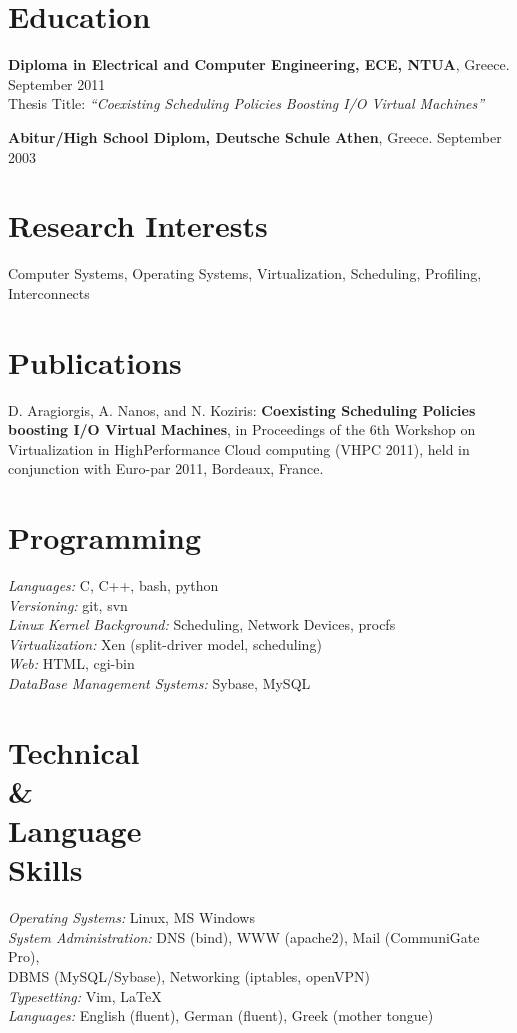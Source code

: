 \documentclass[margin,centered]{res}
\newenvironment{list1}{
  \begin{list}{\ding{71}}{%
      \setlength{\itemsep}{0in}
      \setlength{\parsep}{0in} \setlength{\parskip}{0in}
      \setlength{\topsep}{0in} \setlength{\partopsep}{0in}
      \setlength{\leftmargin}{0.17in}}}{\end{list}}
\begin{document}
\begin{resume}

\section{\sc Education}
\begin{list1}
\item
{\bf Diploma in Electrical and Computer Engineering, ECE, NTUA}, Greece. September 2011\\
Thesis Title:  \textit{``Coexisting Scheduling Policies Boosting I/O Virtual Machines''}
\item
{\bf Abitur/High School Diplom, Deutsche Schule Athen}, Greece. September 2003
\end{list1}
\section{\sc Research Interests}
Computer Systems, Operating Systems, Virtualization, Scheduling, Profiling, Interconnects

\section{\sc Publications}
D. Aragiorgis, A. Nanos, and N. Koziris: \textbf{Coexisting Scheduling Policies boosting I/O Virtual Machines}, in Proceedings of the 6th Workshop on Virtualization in HighPerformance Cloud computing (VHPC 2011), held in conjunction with Euro-par 2011, Bordeaux, France.

\section{\sc Programming}
\textit{Languages:} C, C++, bash, python \\
\textit{Versioning:} git, svn\\
\textit{Linux Kernel Background:} Scheduling, Network Devices, procfs \\
\textit{Virtualization:} Xen (split-driver model, scheduling) \\
\textit{Web:} HTML, cgi-bin \\
\textit{DataBase Management Systems:} Sybase, MySQL \\

\section{\sc Technical\\\&\\Language\\Skills}
\textit{Operating Systems:} Linux, MS Windows \\
\textit{System Administration:} DNS (bind), WWW (apache2), Mail (CommuniGate Pro), \\ DBMS (MySQL/Sybase), Networking (iptables, openVPN)\\
\textit{Typesetting:} Vim, \LaTeX \\
\textit{Languages:} English (fluent), German (fluent), Greek (mother tongue)


\end{resume}
\end{document}
